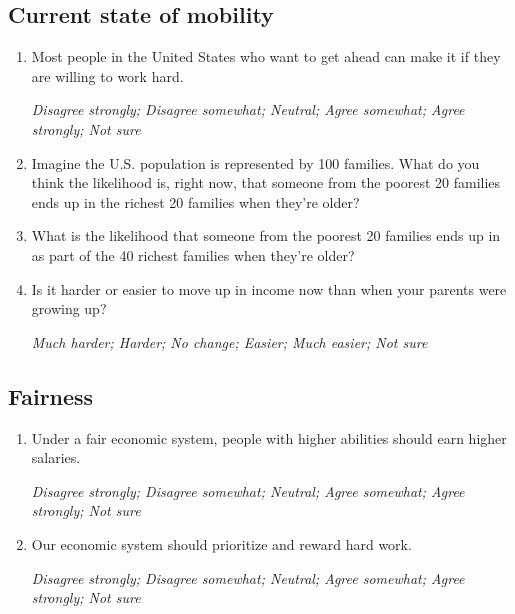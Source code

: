 \documentclass[11pt, headsepline]{article}
\begin{document}
\subsection{Current state of mobility}

\begin{enumerate}[resume]
    \item Most people in the United States who want to get ahead can make it if they are willing to work hard.

    \textit{Disagree strongly; Disagree somewhat; Neutral; Agree somewhat; Agree strongly; Not sure}

    \item Imagine the U.S. population is represented by 100 families. What do you think the likelihood is, right now, that someone from the poorest 20 families ends up in the richest 20 families when they're older?


    \item What is the likelihood that someone from the poorest 20 families ends up in as part of the 40 richest families when they're older?


    \item Is it harder or easier to move up in income now than when your parents were growing up? 

    \textit{Much harder; Harder; No change; Easier; Much easier; Not sure}
\end{enumerate}

\subsection{Fairness}

\begin{enumerate}[resume]
    \item Under a fair economic system, people with higher abilities should earn higher salaries.

    \textit{Disagree strongly; Disagree somewhat; Neutral; Agree somewhat; Agree strongly; Not sure}

    \item Our economic system should prioritize and reward hard work.

    \textit{Disagree strongly; Disagree somewhat; Neutral; Agree somewhat; Agree strongly; Not sure}  
\end{enumerate}
\end{document}
